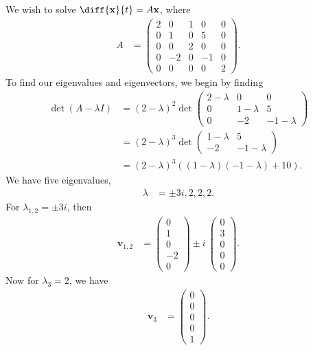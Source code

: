 \documentclass[10pt]{mypackage}
\begin{document}
\begin{example}
  We wish to solve $\diff{\mathbf{x}}{t} = A\mathbf{x}$, where
  \begin{align*}
    A &= \begin{pmatrix}2 & 0 & 1 & 0 & 0 \\ 0 & 1 & 0 & 5 & 0 \\ 0 & 0 & 2 & 0 & 0 \\ 0 & -2 & 0 & -1 & 0 \\ 0 & 0 & 0 & 0 & 2\end{pmatrix}.
  \end{align*}
  To find our eigenvalues and eigenvectors, we begin by finding
  \begin{align*}
    \det\left( A - \lambda I \right) &= \left( 2-\lambda \right)^2 \det \begin{pmatrix}2-\lambda & 0 & 0 \\ 0 & 1-\lambda & 5 \\ 0 & -2 & -1-\lambda\end{pmatrix}\\
                                     &= \left( 2-\lambda \right)^3 \det \begin{pmatrix}1-\lambda & 5 \\ -2 & -1-\lambda\end{pmatrix}\\
                                     &= \left( 2-\lambda \right)^3 \left( \left( 1-\lambda \right)\left( -1-\lambda \right) + 10 \right).
  \end{align*}
  We have five eigenvalues,
  \begin{align*}
    \lambda &= \pm 3i,2,2,2.
  \end{align*}
  For $\lambda_{1,2} = \pm3i$, then
  \begin{align*}
    \mathbf{v}_{1,2} &= \begin{pmatrix}0\\1\\0\\-2\\0\end{pmatrix} \pm i \:\begin{pmatrix}0\\3\\0\\0\\0\end{pmatrix}.
  \end{align*}
  Now for $\lambda_3 = 2$, we have
  \begin{align*}
    \mathbf{v}_3 &= \begin{pmatrix}0\\0\\0\\0\\1\end{pmatrix}.

\end{align*}
\end{example}
\end{document}
